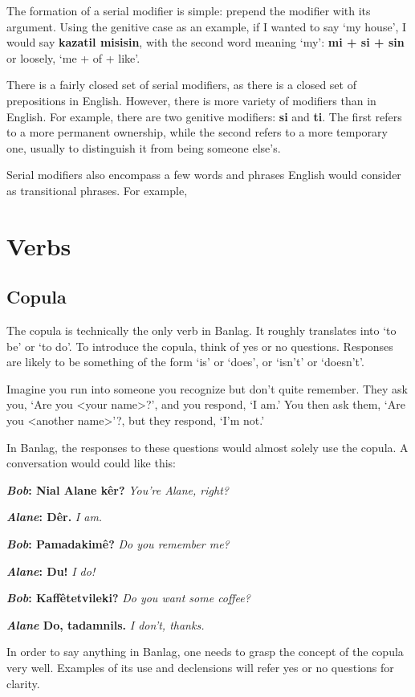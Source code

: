 \documentclass[12pt]{report}
\begin{document}
The formation of a serial modifier is simple: prepend the modifier with its argument. Using the genitive case as an example, if I wanted to say `my house', I would say \textbf{kazatil misisin}, with the second word meaning `my': \textbf{mi + si + sin} or loosely, `me + of + like'.

There is a fairly closed set of serial modifiers, as there is a closed set of prepositions in English. However, there is more variety of modifiers than in English. For example, there are two genitive modifiers: \textbf{si} and \textbf{ti}. The first refers to a more permanent ownership, while the second refers to a more temporary one, usually to distinguish it from being someone else's. 

Serial modifiers also encompass a few words and phrases English would consider as transitional phrases. For example, 

\chapter{Verbs}
\section{Copula}
The copula is technically the only verb in Banlag. It roughly translates into `to be' or `to do'. To introduce the copula, think of yes or no questions. Responses are likely to be something of the form `is' or `does', or `isn't' or `doesn't'.

Imagine you run into someone you recognize but don't quite remember. They ask you, `Are you <your name>?', and you respond, `I am.' You then ask them, `Are you <another name>'?, but they respond, `I'm not.'

In Banlag, the responses to these questions would almost solely use the copula. A conversation would could like this:

\textbf{\textit{Bob}: Nial Alane k\^er?} \textit{You're Alane, right?}

\textbf{\textit{Alane}: D\^ er.} \textit{I am.}

\textbf{\textit{Bob}: Pamadakim\^e?} \textit{Do you remember me?}

\textbf{\textit{Alane}: Du!} \textit{I do!}

\textbf{\textit{Bob}: Kaff\^etetvileki?} \textit{Do you want some coffee?}

\textbf{\textit{Alane} Do, tadamnils.} \textit{I don't, thanks.}

In order to say anything in Banlag, one needs to grasp the concept of the copula very well. Examples of its use and declensions will refer yes or no questions for clarity. 
\end{document}
